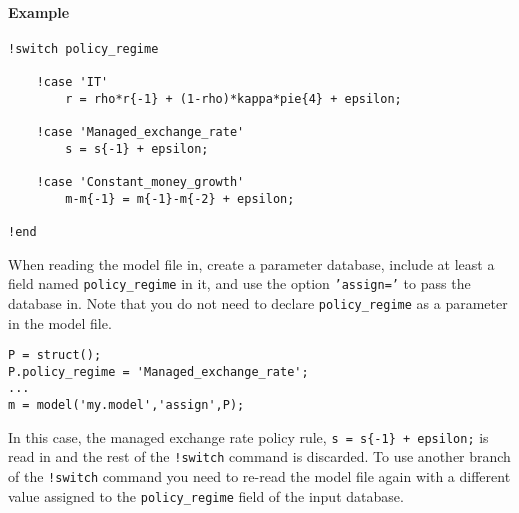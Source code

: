 \paragraph{Example}\label{example}

\begin{verbatim}
!switch policy_regime

    !case 'IT'
        r = rho*r{-1} + (1-rho)*kappa*pie{4} + epsilon;

    !case 'Managed_exchange_rate'
        s = s{-1} + epsilon;

    !case 'Constant_money_growth'
        m-m{-1} = m{-1}-m{-2} + epsilon;
   
!end
\end{verbatim}

When reading the model file in, create a parameter database, include at
least a field named \texttt{policy\_regime} in it, and use the option
\texttt{'assign='} to pass the database in. Note that you do not need to
declare \texttt{policy\_regime} as a parameter in the model file.

\begin{verbatim}
P = struct();
P.policy_regime = 'Managed_exchange_rate';
...
m = model('my.model','assign',P);
\end{verbatim}

In this case, the managed exchange rate policy rule,
\texttt{s = s\{-1\} + epsilon;} is read in and the rest of the
\texttt{!switch} command is discarded. To use another branch of the
\texttt{!switch} command you need to re-read the model file again with a
different value assigned to the \texttt{policy\_regime} field of the
input database.


